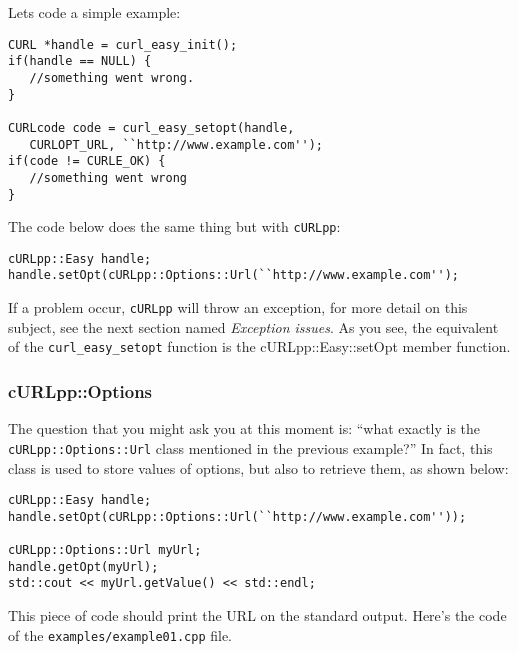 \documentclass{article}
\begin{document}
Lets code a simple example:

\begin{verbatim}
CURL *handle = curl_easy_init();
if(handle == NULL) {
   //something went wrong.
}

CURLcode code = curl_easy_setopt(handle, 
   CURLOPT_URL, ``http://www.example.com'');
if(code != CURLE_OK) {
   //something went wrong
}
\end{verbatim}
The code below does the same thing but with \verb+cURLpp+:

\begin{verbatim}
cURLpp::Easy handle;
handle.setOpt(cURLpp::Options::Url(``http://www.example.com'');
\end{verbatim}

If a problem occur, \verb+cURLpp+ will throw an exception, for more detail on this subject,
see the next section named \textit{Exception issues}. As you see, the equivalent
of the \verb+curl_easy_setopt+ function is the cURLpp::Easy::setOpt member function.

\subsubsection{cURLpp::Options}

The question that you might ask you at this moment is: ``what exactly is the 
\verb+cURLpp::Options::Url+ class mentioned in the previous example?'' In fact, 
this class is used to store values of options, but also to retrieve them, as shown
below:

\begin{verbatim}
cURLpp::Easy handle;
handle.setOpt(cURLpp::Options::Url(``http://www.example.com''));

cURLpp::Options::Url myUrl;
handle.getOpt(myUrl);
std::cout << myUrl.getValue() << std::endl;
\end{verbatim}

This piece of code should print the URL on the standard output. Here's the
code of the \verb+examples/example01.cpp+ file.
\end{document}
